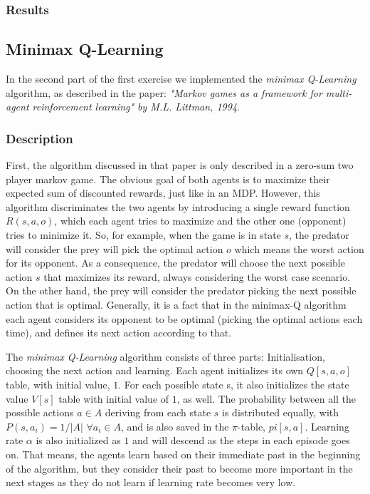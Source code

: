 \documentclass[a4paper,11pt]{article}
\begin{document}
\subsubsection{Results}


\subsection{Minimax Q-Learning}

In the second part of the first exercise we implemented the \textit{minimax Q-Learning} algorithm, as described in the paper: \textit{"Markov games as a framework for multi-agent reinforcement learning" by M.L. Littman, 1994}.

\subsubsection{Description}
First, the algorithm discussed in that paper is only described in a zero-sum two player markov game. The obvious goal of both agents is to maximize their expected sum of discounted rewards, just like in an MDP. However, this algorithm discriminates the two agents by introducing a single reward function $R(s,a,o)$, which each agent tries to maximize and the other one (opponent) tries to minimize it. So, for example, when the game is in state $s$, the predator will consider the prey will pick the optimal action $o$ which means the worst action for its opponent. As a consequence, the predator will choose the next possible action $s$ that maximizes its reward, always considering the worst case scenario. On the other hand, the prey will consider the predator picking the next possible action that is optimal. Generally, it is a fact that in the minimax-Q algorithm each agent considers its opponent to be optimal (picking the optimal actions each time), and defines its next action according to that. 

The \textit{minimax Q-Learning} algorithm consists of three parts: 	Initialisation, choosing the next action and learning. Each agent initializes its own $Q[s,a,o]$ table, with initial value, $1$. For each possible state s, it also initializes the state value $V[s]$ table with initial value of $1$, as well. The probability between all the possible actions $a \in A$ deriving from each state $s$ is distributed equally, with $P(s,a_{i}) = 1/|A|$ $\forall a_i \in A$, and is also saved in the $\pi$-table, $pi[s,a]$. Learning rate $\alpha$ is also initialized as $1$ and will descend as the steps in each episode goes on. That means, the agents learn based on their immediate past in the beginning of the algorithm, but they consider their past to become more important in the next stages as they do not learn if learning rate becomes very low.
\end{document}
